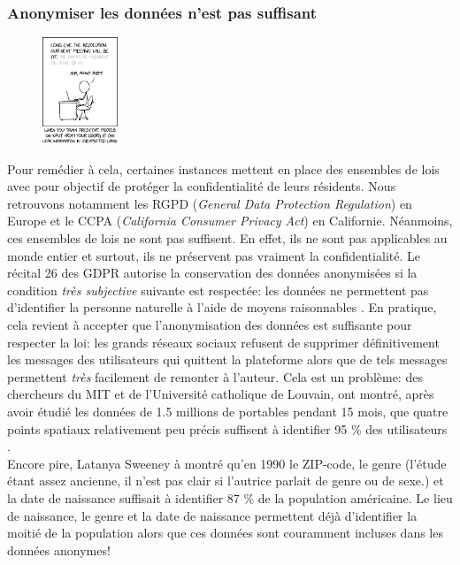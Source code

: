 \subsubsection{Anonymiser les données n'est pas suffisant}


\begin{figure}
    \centering
    \includegraphics[width=0.20\textwidth, clip]{"./proofs/figures/predictive_models.png"}
\end{figure}


Pour remédier à cela, certaines instances mettent en place des ensembles de lois avec pour objectif de protéger la confidentialité de leurs résidents. Nous retrouvons notamment les RGPD (\textit{General Data Protection Regulation}) en Europe et le CCPA (\textit{California Consumer Privacy Act}) en Californie. Néanmoins, ces ensembles de lois ne sont pas suffisent. En effet, ils ne sont pas applicables au monde entier et surtout, ils ne préservent pas vraiment la confidentialité. Le récital 26 des GDPR autorise la conservation des données anonymisées si la condition \textit{très subjective} suivante est respectée: les données ne permettent pas d'identifier la personne naturelle à l'aide de moyens raisonnables \cite{rec26}. En pratique, cela revient à accepter que l'anonymisation des données est suffisante pour respecter la loi: les grands réseaux sociaux refusent de supprimer définitivement les messages des utilisateurs qui quittent la plateforme alors que de tels messages permettent \textit{très} facilement de remonter à l'auteur. Cela est un problème: des chercheurs du MIT et de l'Université catholique de Louvain, ont montré, après avoir étudié les données de 1.5 millions de portables pendant 15 mois, que quatre points spatiaux relativement peu précis suffisent à identifier 95 \% des utilisateurs \cite{cell}.\\

Encore pire, {\sc Latanya Sweeney} à montré \cite{link} qu'en 1990 le ZIP-code, le genre (l'étude étant assez ancienne, il n'est pas clair si l'autrice parlait de genre ou de sexe.) et la date de naissance suffisait à identifier 87 \% de la population américaine. Le lieu de naissance, le genre et la date de naissance permettent déjà d'identifier la moitié de la population alors que ces données sont couramment incluses dans les données anonymes!


